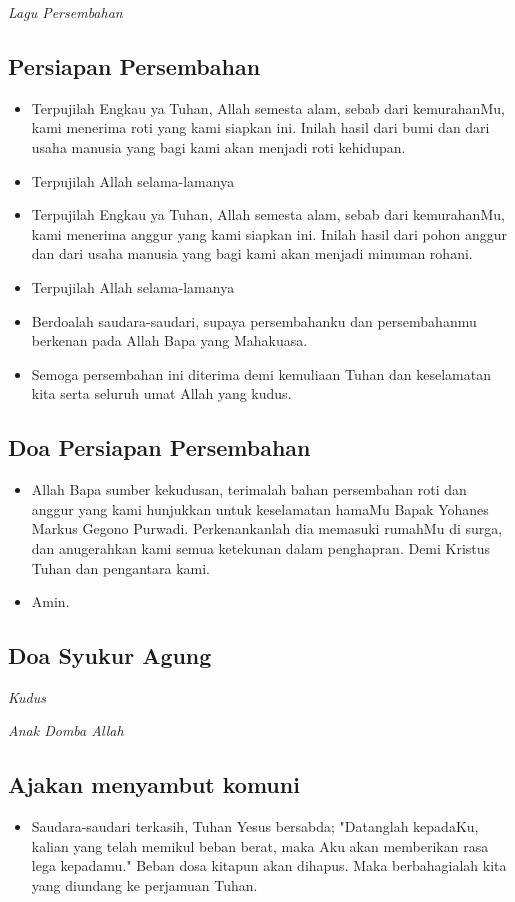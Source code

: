 \documentclass[a5paper,headsepline,titlepage,12pt,nnormalheadings,DIVcalc,twoside]{scrbook}
\makeatletter
\newcommand{\lagu}[1]{%
  {\parindent \z@ 
    \interlinepenalty\@M \slshape \mdseries \large \textit{#1}\par\nobreak \vskip 10\p@ }}
\newcommand{\BU}[1]{\begin{itemize} \item[U:] #1 \end{itemize}}
\newcommand{\BI}[1]{\begin{itemize} \item[I:] #1 \end{itemize}}
\newcommand{\namaalm}{Bapak Yohanes Markus Gegono Purwadi}
\makeatother
\begin{document}
\lagu{Lagu Persembahan}
\subsection*{Persiapan Persembahan}

\BI{Terpujilah Engkau ya Tuhan, Allah semesta alam, sebab dari kemurahanMu, kami menerima roti yang kami siapkan ini. Inilah hasil dari bumi dan dari usaha manusia yang bagi kami akan menjadi roti kehidupan.}

\BU{Terpujilah Allah selama-lamanya}

\BI{Terpujilah Engkau ya Tuhan, Allah semesta alam, sebab dari kemurahanMu, kami menerima anggur yang kami siapkan ini. Inilah hasil dari pohon anggur dan dari usaha manusia yang bagi kami akan menjadi minuman rohani.}

\BU{Terpujilah Allah selama-lamanya}

\BI{Berdoalah saudara-saudari, supaya persembahanku dan persembahanmu berkenan pada Allah Bapa yang Mahakuasa.}

\BU{Semoga persembahan ini diterima demi kemuliaan Tuhan dan keselamatan kita serta seluruh umat Allah yang kudus.}

\subsection*{Doa Persiapan Persembahan}

\BI{Allah Bapa sumber kekudusan, terimalah bahan persembahan roti dan anggur yang kami hunjukkan untuk keselamatan hamaMu \namaalm. Perkenankanlah dia memasuki rumahMu di surga, dan anugerahkan kami semua ketekunan dalam penghapran. Demi Kristus Tuhan dan pengantara kami.}

\BU{Amin.}


\subsection*{Doa Syukur Agung}

\lagu{Kudus}

\lagu{Anak Domba Allah}

\subsection*{Ajakan menyambut komuni}

\BI{Saudara-saudari terkasih, Tuhan Yesus bersabda; "Datanglah kepadaKu, kalian yang telah memikul beban berat, maka Aku akan memberikan rasa lega kepadamu." Beban dosa kitapun akan dihapus. Maka berbahagialah kita yang diundang ke perjamuan Tuhan.}
\end{document}
